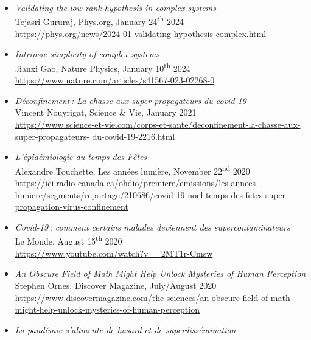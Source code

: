 \documentclass[11pt]{article}
\begin{document}
\begin{itemize}[itemsep=0.5em, first*=\small]
%
  \item \parbox[t]{0.9\textwidth}{\textit{Validating the low-rank hypothesis in complex systems}\\
  {\small Tejasri Gururaj, Phys.org, January 24\textsuperscript{th} 2024}\\
  \footnotesize\url{https://phys.org/news/2024-01-validating-hypothesis-complex.html}}
%
  \item \parbox[t]{0.9\textwidth}{\textit{Intrinsic simplicity of complex systems}\\
  {\small Jianxi Gao, Nature Physics, January 10\textsuperscript{th} 2024}\\
  \footnotesize\url{https://www.nature.com/articles/s41567-023-02268-0}}
%
  \item \parbox[t]{0.9\textwidth}{\textit{Déconfinement\,: La chasse aux super-propagateurs du covid-19}\\
  {\small Vincent Nouyrigat, Science \& Vie, January 2021}\\
  \footnotesize\url{https://www.science-et-vie.com/corps-et-sante/deconfinement-la-chasse-aux-super-propagateurs- du-covid-19-2216.html}}
%
  \item \parbox[t]{0.9\textwidth}{\textit{L'épidémiologie du temps des Fêtes}\\
  {\small Alexandre Touchette, Les années lumière, November 22\textsuperscript{nd} 2020}\\
  \footnotesize\url{https://ici.radio-canada.ca/ohdio/premiere/emissions/les-annees-lumiere/segments/reportage/210686/covid-19-noel-temps-des-fetes-super-propagation-virus-confinement}}
%
  \item \parbox[t]{0.9\textwidth}{\textit{Covid-19\,: comment certains malades deviennent des supercontaminateurs}\\
  {\small Le Monde, August 15\textsuperscript{th} 2020}\\
  \footnotesize\url{https://www.youtube.com/watch?v=_2MT1r-Cmsw}}
%
  \item \parbox[t]{0.9\textwidth}{\textit{An Obscure Field of Math Might Help Unlock Mysteries of Human Perception}\\
  {\small Stephen Ornes, Discover Magazine, July/August 2020}\\
  \footnotesize\url{https://www.discovermagazine.com/the-sciences/an-obscure-field-of-math-might-help-unlock-mysteries-of-human-perception}}
%
  \item \parbox[t]{0.9\textwidth}{\textit{La pandémie s'alimente de hasard et de superdissémination}\\
}
\end{itemize}
\end{document}
